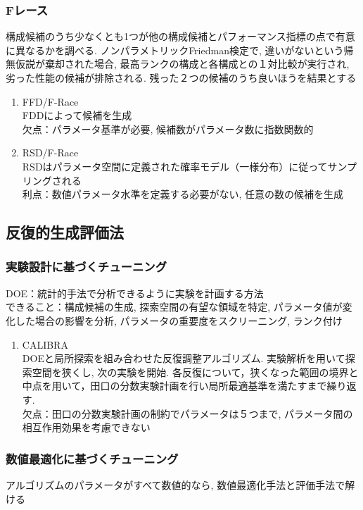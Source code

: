 \documentclass[twocolumn]{jarticle}     %
\begin{document}
\subsubsection{Fレース}
構成候補のうち少なくとも1つが他の構成候補とパフォーマンス指標の点で有意に異なるかを調べる. ノンパラメトリックFriedman検定で, 違いがないという帰無仮説が棄却された場合, 最高ランクの構成と各構成との１対比較が実行され, 劣った性能の候補が排除される. 残った２つの候補のうち良いほうを結果とする

\begin{enumerate}
  \item FFD/F-Race \\
  FDDによって候補を生成\\
  欠点：パラメータ基準が必要, 候補数がパラメータ数に指数関数的

  \item RSD/F-Race \\
  RSDはパラメータ空間に定義された確率モデル（一様分布）に従ってサンプリングされる\\
  利点：数値パラメータ水準を定義する必要がない, 任意の数の候補を生成
\end{enumerate}

\subsection{反復的生成評価法}

\subsubsection{実験設計に基づくチューニング}
DOE：統計的手法で分析できるように実験を計画する方法\\
できること：構成候補の生成, 探索空間の有望な領域を特定, パラメータ値が変化した場合の影響を分析, パラメータの重要度をスクリーニング, ランク付け

\begin{enumerate}
  \item CALIBRA \\
  DOEと局所探索を組み合わせた反復調整アルゴリズム.
  実験解析を用いて探索空間を狭くし, 次の実験を開始.
  各反復について，狭くなった範囲の境界と中点を用いて，田口の分数実験計画を行い局所最適基準を満たすまで繰り返す. \\
  欠点：田口の分数実験計画の制約でパラメータは５つまで, パラメータ間の相互作用効果を考慮できない

\end{enumerate}

\subsubsection{数値最適化に基づくチューニング}
アルゴリズムのパラメータがすべて数値的なら, 数値最適化手法と評価手法で解ける
\end{document}
